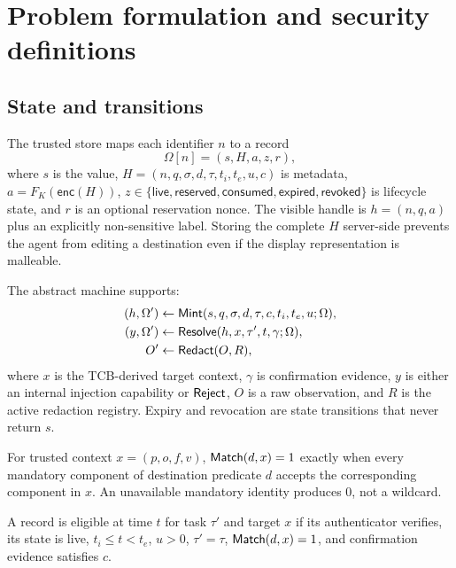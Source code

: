 \section{Problem formulation and security definitions}
\label{sec:problem}

\subsection{State and transitions}

The trusted store maps each identifier $n$ to a record
\begin{equation}
\Omega[n]=(s,H,a,z,r),
\label{eq:record}
\end{equation}
where $s$ is the value, $H=(n,q,\sigma,d,\tau,t_i,t_e,u,c)$ is metadata, $a=F_K(\mathsf{enc}(H))$, $z\in\{\mathsf{live},\mathsf{reserved},\mathsf{consumed},\mathsf{expired},\mathsf{revoked}\}$ is lifecycle state, and $r$ is an optional reservation nonce. The visible handle is $h=(n,q,a)$ plus an explicitly non-sensitive label. Storing the complete $H$ server-side prevents the agent from editing a destination even if the display representation is malleable.

The abstract machine supports:
\begin{align}
  (h,\Omega') &\leftarrow \mathsf{Mint}(s,q,\sigma,d,\tau,c,t_i,t_e,u;\Omega), \label{eq:mint}\\
  (y,\Omega') &\leftarrow \mathsf{Resolve}(h,x,\tau',t,\gamma;\Omega), \label{eq:resolve}\\
  O' &\leftarrow \mathsf{Redact}(O,R), \label{eq:redact}
\end{align}
where $x$ is the TCB-derived target context, $\gamma$ is confirmation evidence, $y$ is either an internal injection capability or $\mathsf{Reject}$, $O$ is a raw observation, and $R$ is the active redaction registry. Expiry and revocation are state transitions that never return $s$.

\begin{definition}
For trusted context $x=(p,o,f,v)$, $\mathsf{Match}(d,x)=1$ exactly when every mandatory component of destination predicate $d$ accepts the corresponding component in $x$. An unavailable mandatory identity produces $0$, not a wildcard.
\end{definition}

\begin{definition}
A record is eligible at time $t$ for task $\tau'$ and target $x$ if its authenticator verifies, its state is live, $t_i\le t<t_e$, $u>0$, $\tau'=\tau$, $\mathsf{Match}(d,x)=1$, and confirmation evidence satisfies $c$.
\end{definition}

